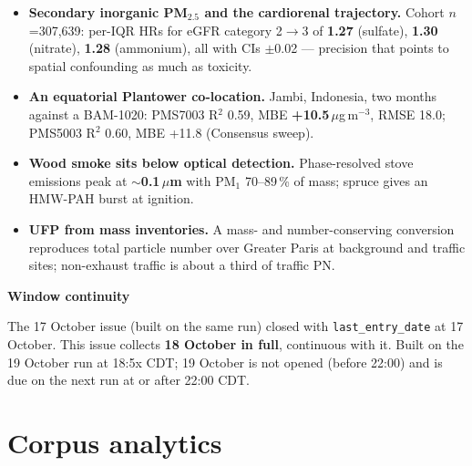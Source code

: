 \documentclass[10pt]{article}
\begin{document}
\footnotesize
\begin{itemize}

\item \textbf{Secondary inorganic PM$_{2.5}$ and the cardiorenal trajectory.} Cohort $n$=307,639: per-IQR HRs for
eGFR category 2$\to$3 of \textbf{1.27} (sulfate), \textbf{1.30} (nitrate), \textbf{1.28} (ammonium), all with CIs
$\pm$0.02 --- precision that points to spatial confounding as much as toxicity.

\item \textbf{An equatorial Plantower co-location.} Jambi, Indonesia, two months against a BAM-1020: PMS7003 R$^2$
0.59, MBE \textbf{+10.5}\,$\mu$g\,m$^{-3}$, RMSE 18.0; PMS5003 R$^2$ 0.60, MBE +11.8 (Consensus sweep).

\item \textbf{Wood smoke sits below optical detection.} Phase-resolved stove emissions peak at \textbf{$\sim$0.1\,$\mu$m}
with PM$_1$ 70--89\,\% of mass; spruce gives an HMW-PAH burst at ignition.

\item \textbf{UFP from mass inventories.} A mass- and number-conserving conversion reproduces total particle number
over Greater Paris at background and traffic sites; non-exhaust traffic is about a third of traffic PN.

\end{itemize}

\vspace{2mm}

\begin{keybox}
{\sffamily\bfseries\footnotesize\color{Deep}Window continuity}\\[1.2mm]
{\fontsize{7.2}{8.8}\selectfont
The 17 October issue (built on the same run) closed with \texttt{last\_entry\_date} at 17 October. This
issue collects \textbf{18 October in full}, continuous with it. Built on the 19 October run at 18:5x CDT; 19 October
is not opened (before 22:00) and is due on the next run at or after 22:00 CDT.\par}
\end{keybox}

\vspace{3mm}
\par{}\baselineskip{}\baselineskip
\section*{\sffamily\bfseries\color{Deep}Corpus analytics}
\vspace{-1.5mm}{\color{Amber}\rule{\linewidth}{1.1pt}}\vspace{2.5mm}
\end{document}
